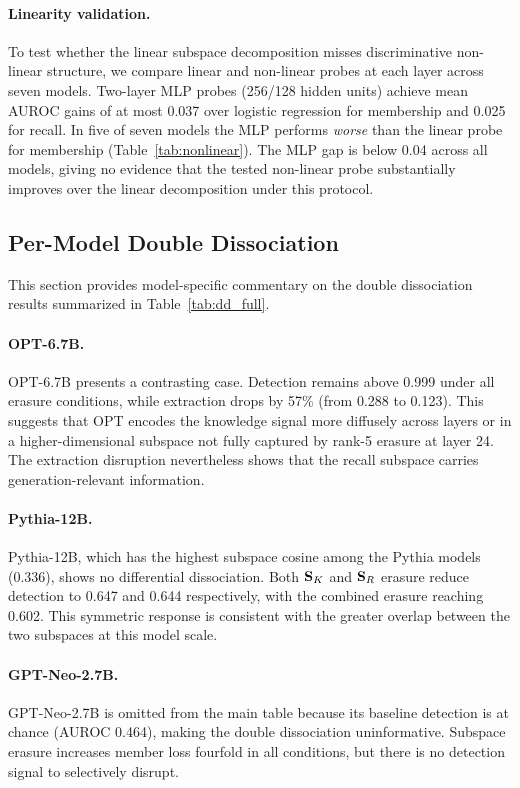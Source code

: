 \paragraph{Linearity validation.}
To test whether the linear subspace decomposition misses discriminative non-linear structure, we compare linear and non-linear probes at each layer across seven models.
Two-layer MLP probes (256/128 hidden units) achieve mean AUROC gains of at most 0.037 over logistic regression for membership and 0.025 for recall. In five of seven models the MLP performs \emph{worse} than the linear probe for membership (Table~\ref{tab:nonlinear}).
The MLP gap is below 0.04 across all models, giving no evidence that the tested non-linear probe substantially improves over the linear decomposition under this protocol.

\FloatBarrier

\subsection{Per-Model Double Dissociation}
\label{app:per_model_dd}

This section provides model-specific commentary on the double dissociation results summarized in Table~\ref{tab:dd_full}.

\paragraph{OPT-6.7B.}
OPT-6.7B presents a contrasting case. Detection remains above 0.999 under all erasure conditions, while extraction drops by 57\% (from 0.288 to 0.123).
This suggests that OPT encodes the knowledge signal more diffusely across layers or in a higher-dimensional subspace not fully captured by rank-5 erasure at layer 24.
The extraction disruption nevertheless shows that the recall subspace carries generation-relevant information.

\paragraph{Pythia-12B.}
Pythia-12B, which has the highest subspace cosine among the Pythia models (0.336), shows no differential dissociation. Both $\mathbf{S}_K$ and $\mathbf{S}_R$ erasure reduce detection to 0.647 and 0.644 respectively, with the combined erasure reaching 0.602.
This symmetric response is consistent with the greater overlap between the two subspaces at this model scale.

\paragraph{GPT-Neo-2.7B.}
GPT-Neo-2.7B is omitted from the main table because its baseline detection is at chance (AUROC 0.464), making the double dissociation uninformative.
Subspace erasure increases member loss fourfold in all conditions, but there is no detection signal to selectively disrupt.

